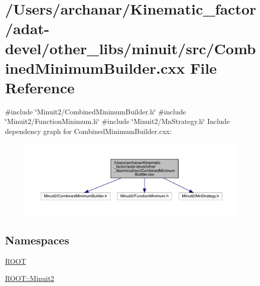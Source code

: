 \hypertarget{adat-devel_2other__libs_2minuit_2src_2CombinedMinimumBuilder_8cxx}{}\section{/\+Users/archanar/\+Kinematic\+\_\+factor/adat-\/devel/other\+\_\+libs/minuit/src/\+Combined\+Minimum\+Builder.cxx File Reference}
\label{adat-devel_2other__libs_2minuit_2src_2CombinedMinimumBuilder_8cxx}
{\ttfamily \#include \char`\"{}Minuit2/\+Combined\+Minimum\+Builder.\+h\char`\"{}}\newline
{\ttfamily \#include \char`\"{}Minuit2/\+Function\+Minimum.\+h\char`\"{}}\newline
{\ttfamily \#include \char`\"{}Minuit2/\+Mn\+Strategy.\+h\char`\"{}}\newline
Include dependency graph for Combined\+Minimum\+Builder.\+cxx\+:
\nopagebreak
\begin{figure}[H]
\begin{center}
\leavevmode
\includegraphics[width=350pt]{d8/d62/adat-devel_2other__libs_2minuit_2src_2CombinedMinimumBuilder_8cxx__incl}
\end{center}
\end{figure}
\subsection*{Namespaces}
\begin{DoxyCompactItemize}
\item 
 \mbox{\hyperlink{namespaceROOT}{R\+O\+OT}}
\item 
 \mbox{\hyperlink{namespaceROOT_1_1Minuit2}{R\+O\+O\+T\+::\+Minuit2}}
\end{DoxyCompactItemize}
